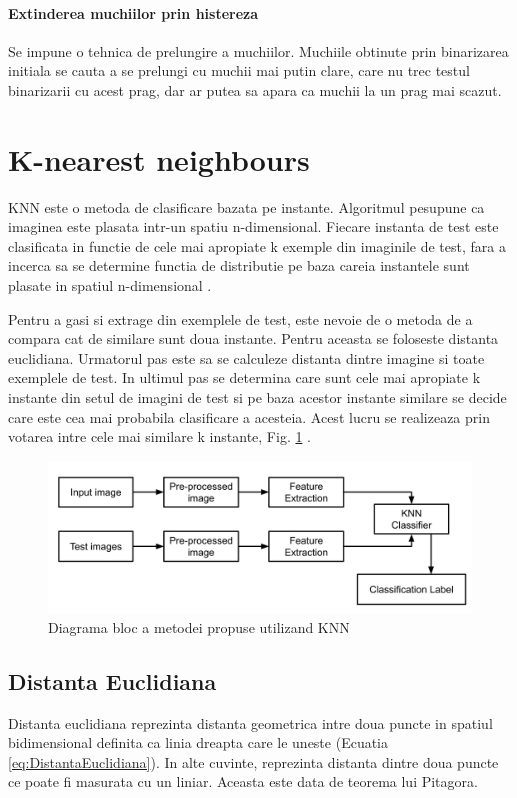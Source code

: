 \documentclass[conference]{IEEEtran}
\begin{document}
\paragraph{Extinderea muchiilor prin histereza} 
Se impune o tehnica de prelungire a muchiilor. Muchiile obtinute prin binarizarea initiala se cauta a se prelungi cu muchii mai putin clare, care nu trec testul binarizarii cu acest prag, dar ar putea sa apara ca muchii la un prag mai scazut.

\section{K-nearest neighbours} \label{sec:K-nearest}
KNN este o metoda de clasificare bazata pe instante. Algoritmul pesupune ca imaginea este plasata intr-un spatiu n-dimensional. Fiecare instanta de test este clasificata in functie de cele mai apropiate k exemple din imaginile de test, fara a incerca sa se determine functia de distributie pe baza careia instantele sunt plasate in spatiul n-dimensional \cite{b4}.

Pentru a gasi si extrage din exemplele de test, este nevoie de o metoda de a compara cat de similare sunt doua instante. Pentru aceasta se foloseste distanta euclidiana. Urmatorul pas este sa se calculeze distanta dintre imagine si toate exemplele de test. In ultimul pas se determina care sunt cele mai apropiate k instante din setul de imagini de test si pe baza acestor instante similare se decide care este cea mai probabila clasificare a acesteia. Acest lucru se realizeaza prin votarea intre cele mai similare k instante, Fig. \ref{fig:KNN} \cite{b5}.

\begin{figure}[h!]
	\includegraphics[width=\linewidth]{Figures/KNN.png}
	\caption{Diagrama bloc a metodei propuse utilizand KNN}
	\label{fig:KNN}
\end{figure}

\subsection{Distanta Euclidiana}
Distanta euclidiana reprezinta distanta geometrica intre doua puncte in spatiul bidimensional definita ca linia dreapta care le uneste (Ecuatia \ref{eq:DistantaEuclidiana}). In alte cuvinte, reprezinta distanta dintre doua puncte ce poate fi masurata cu un liniar. Aceasta este data de teorema lui Pitagora.
\end{document}
